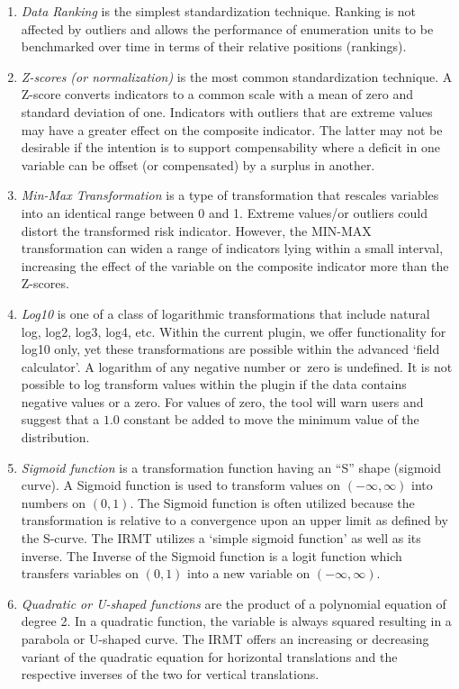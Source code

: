\begin{enumerate}
    \item \emph{Data Ranking} is the simplest standardization technique.
    Ranking is not affected by outliers and allows the performance of
    enumeration units to be benchmarked over time in terms of their relative
    positions (rankings).

    \item \emph{Z-scores (or normalization)} is the most common standardization
    technique.  A Z-score converts indicators to a common scale with a mean of
    zero and standard deviation of one. Indicators with outliers that are
    extreme values may have a greater effect on the composite indicator. The
    latter may not be desirable if the intention is to support compensability
    where a deficit in one variable can be offset (or compensated) by a surplus
    in another.

    \item \emph{Min-Max Transformation} is a type of transformation that
    rescales variables into an identical range between 0 and 1. Extreme
    values/or outliers could distort the transformed risk indicator. However,
    the MIN-MAX transformation can widen a range of indicators lying within a
    small interval, increasing the effect of the variable on the composite
    indicator more than the Z-scores.

    \item \emph{Log10} is one of a class of logarithmic transformations that
    include natural log, log2, log3, log4, etc. Within the current plugin, we
    offer functionality for log10 only, yet these transformations are possible
    within the advanced `field calculator'. A logarithm of any negative number
    or zero is undefined. It is not possible to log transform values within the
    plugin if the data contains negative values or a zero. For values of zero,
    the tool will warn users and suggest that a $1.0$ constant be added to move
    the minimum value of the distribution.

    \item \emph{Sigmoid function} is a transformation function having an ``S''
    shape (sigmoid curve). A Sigmoid function is used to transform values on
    $(-\infty, \infty)$ into numbers on $(0, 1)$.  The Sigmoid function is often
    utilized because the transformation is relative to a convergence upon an
    upper limit as defined by the S-curve. The IRMT utilizes a `simple sigmoid
    function' as well as its inverse. The Inverse of the Sigmoid function is a
    logit function which transfers variables on $(0, 1)$ into a new variable on
    $(-\infty, \infty)$.

    \item \emph{Quadratic or U-shaped functions} are the product of a
    polynomial equation of degree 2. In a quadratic function, the variable is
    always squared resulting in a parabola or U-shaped curve. The IRMT offers
    an increasing or decreasing variant of the quadratic equation for
    horizontal translations and the respective inverses of the two for vertical
    translations.
\end{enumerate}

